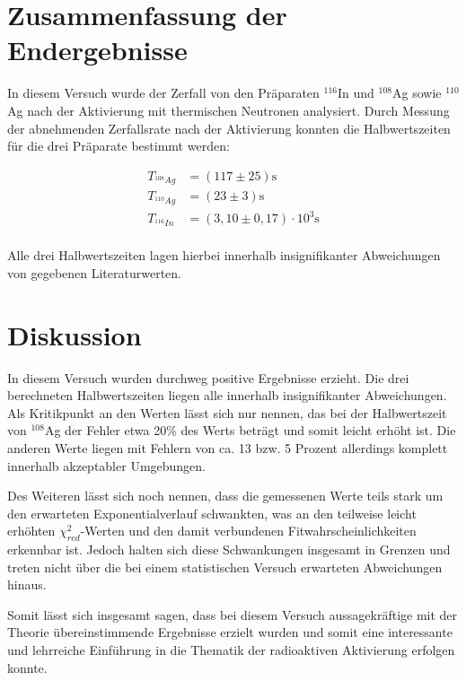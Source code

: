 \documentclass{article}
\newcommand\invisiblesection[1]{%
  \refstepcounter{section}%
  \addcontentsline{toc}{section}{\protect\numberline{\thesection}#1}%
  \sectionmark{#1}\phantom{}}
\begin{document}
\section{Zusammenfassung der Endergebnisse}

In diesem Versuch wurde der Zerfall von den Präparaten $^{116}$In und $^{108}$Ag sowie $^{110}$Ag nach der Aktivierung mit thermischen Neutronen analysiert. Durch Messung der abnehmenden Zerfallsrate nach der Aktivierung konnten die Halbwertszeiten für die drei Präparate bestimmt werden:

\begin{equation}
    \begin{split}
        T_{^{108}Ag} &= (117 \pm 25) \text{s} \\ 
        T_{^{110}Ag} &= (23 \pm 3) \text{s} \\ 
        T_{^{116}In} &= (3,10 \pm 0,17) \cdot 10^{3} \text{s} \\ 
    \end{split}
\end{equation}

Alle drei Halbwertszeiten lagen hierbei innerhalb insignifikanter Abweichungen von gegebenen Literaturwerten. 


\section{Diskussion}

In diesem Versuch wurden durchweg positive Ergebnisse erzieht. Die drei berechneten Halbwertszeiten liegen alle innerhalb insignifikanter Abweichungen. Als Kritikpunkt an den Werten lässt sich nur nennen, das bei der Halbwertszeit von $^{108}$Ag der Fehler etwa 20\% des Werts beträgt und somit leicht erhöht ist. Die anderen Werte liegen mit Fehlern von ca. 13 bzw. 5 Prozent allerdings komplett innerhalb akzeptabler Umgebungen. 

Des Weiteren lässt sich noch nennen, dass die gemessenen Werte teils stark um den erwarteten Exponentialverlauf schwankten, was an den teilweise leicht erhöhten $\chi^2_{red}$-Werten und den damit verbundenen Fitwahrscheinlichkeiten erkennbar ist. Jedoch halten sich diese Schwankungen insgesamt in Grenzen und treten nicht über die bei einem statistischen Versuch erwarteten Abweichungen hinaus. 

Somit lässt sich insgesamt sagen, dass bei diesem Versuch aussagekräftige mit der Theorie übereinstimmende Ergebnisse erzielt wurden und somit eine interessante und lehrreiche Einführung in die Thematik der radioaktiven Aktivierung erfolgen konnte. 

 
\newpage


\end{document}
